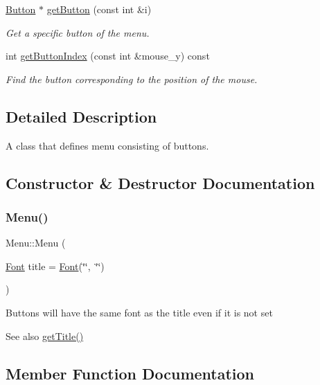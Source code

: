 \begin{DoxyCompactItemize}
\mbox{\hyperlink{class_button}{Button}} $\ast$ \mbox{\hyperlink{class_menu_a4562dd0e950bb83ae1ddaa3864353e06}{get\+Button}} (const int \&i)
\begin{DoxyCompactList}\small\item\em Get a specific button of the menu. \end{DoxyCompactList}\item 
int \mbox{\hyperlink{class_menu_a83b3fc6786188f496f87658e099f2371}{get\+Button\+Index}} (const int \&mouse\+\_\+y) const
\begin{DoxyCompactList}\small\item\em Find the button corresponding to the position of the mouse. \end{DoxyCompactList}\end{DoxyCompactItemize}


\subsection{Detailed Description}
A class that defines menu consisting of buttons. 

\subsection{Constructor \& Destructor Documentation}
\mbox{\label{class_menu_af2baf3084bfc956b6727558008e7f5a0}} 
\subsubsection{\texorpdfstring{Menu()}{Menu()}}
{\footnotesize\ttfamily Menu\+::\+Menu (\begin{DoxyParamCaption}\item[{\mbox{\hyperlink{class_font}{Font}}}]{title = {\ttfamily \mbox{\hyperlink{class_font}{Font}}(\char`\"{}\char`\"{},~\char`\"{}\char`\"{})} }\end{DoxyParamCaption})}

Buttons will have the same font as the title even if it is not set \begin{DoxySeeAlso}{See also}
\mbox{\hyperlink{class_menu_a5e5ab9761f37464740171acef5f53ad6}{get\+Title()}} 
\end{DoxySeeAlso}


\subsection{Member Function Documentation}
\mbox{\label{class_menu_a4562dd0e950bb83ae1ddaa3864353e06}} 

